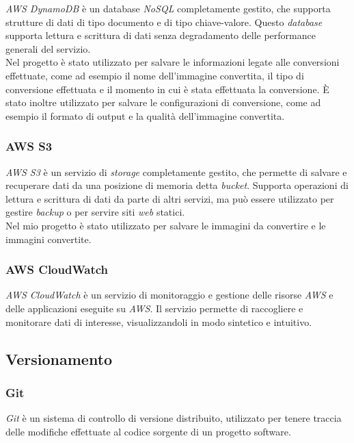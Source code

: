 \emph{AWS DynamoDB} è un database \emph{NoSQL} completamente gestito, che
supporta strutture di dati di tipo documento e di tipo chiave-valore. Questo
\emph{database} supporta lettura e scrittura di dati senza degradamento delle
performance generali del servizio. \\
Nel progetto è stato utilizzato per salvare le informazioni legate alle
conversioni effettuate, come ad esempio il nome dell'immagine convertita, il
tipo di conversione effettuata e il momento in cui è stata effettuata la
conversione. È stato inoltre utilizzato per salvare le configurazioni di
conversione, come ad esempio il formato di output e la qualità dell'immagine
convertita.

\subsubsection*{AWS S3}

\emph{AWS S3} è un servizio di \emph{storage} completamente gestito, che
permette di salvare e recuperare dati da una posizione di memoria detta
\emph{bucket}. Supporta operazioni di lettura e scrittura di dati da parte di
altri servizi, ma può essere utilizzato per gestire \emph{backup} o per servire
siti \emph{web} statici. \\
Nel mio progetto è stato utilizzato per salvare le immagini da convertire e le
immagini convertite.

\subsubsection*{AWS CloudWatch}

\emph{AWS CloudWatch} è un servizio di monitoraggio e gestione delle risorse
\emph{AWS} e delle applicazioni eseguite su \emph{AWS}. Il servizio permette di
raccogliere e monitorare dati di interesse, visualizzandoli in modo sintetico e
intuitivo.

\subsection{Versionamento}

\subsubsection*{Git}

\emph{Git} è un sistema di controllo di versione distribuito, utilizzato per
tenere traccia delle modifiche effettuate al codice sorgente di un progetto
\glsfirstoccur\gls{software}.

